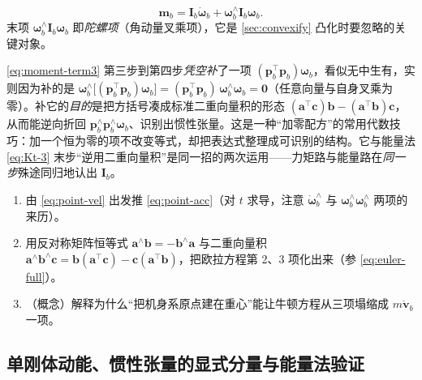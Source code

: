 \begin{equation}
  \boxed{\boldsymbol{m}_b=\mathbf{I}_b\dot{\boldsymbol{\omega}}_b+\boldsymbol{\omega}_b^\wedge\mathbf{I}_b\boldsymbol{\omega}_b}.
  \label{eq:euler-full}
\end{equation}
末项 $\boldsymbol{\omega}_b^\wedge\mathbf{I}_b\boldsymbol{\omega}_b$ 即\emph{陀螺项}（角动量叉乘项），它是 \cref{sec:convexify} 凸化时要忽略的关键对象。

\begin{note}\label{note:gyro-add-zero}
\cref{eq:moment-term3} 第三步到第四步\emph{凭空补}了一项 $(\boldsymbol{p}_b^\top\boldsymbol{p}_b)\boldsymbol{\omega}_b$，看似无中生有，实则因为补的是 $\boldsymbol{\omega}_b^\wedge\big[(\boldsymbol{p}_b^\top\boldsymbol{p}_b)\boldsymbol{\omega}_b\big]=(\boldsymbol{p}_b^\top\boldsymbol{p}_b)\,\boldsymbol{\omega}_b^\wedge\boldsymbol{\omega}_b=\mathbf{0}$（任意向量与自身叉乘为零）。补它的\emph{目的}是把方括号凑成标准二重向量积的形态 $(\boldsymbol{a}^\top\boldsymbol{c})\boldsymbol{b}-(\boldsymbol{a}^\top\boldsymbol{b})\boldsymbol{c}$，从而能逆向折回 $\boldsymbol{p}_b^\wedge\boldsymbol{p}_b^\wedge\boldsymbol{\omega}_b$、识别出惯性张量。这是一种“加零配方”的常用代数技巧：加一个恒为零的项不改变等式，却把表达式整理成可识别的结构。它与能量法 \cref{eq:Kt-3} 末步“逆用二重向量积”是同一招的两次运用——力矩路与能量路在\emph{同一步}殊途同归地认出 $\mathbf{I}_b$。
\end{note}

\begin{practice}
\begin{enumerate}
  \item 由 \cref{eq:point-vel} 出发推 \cref{eq:point-acc}（对 $t$ 求导，注意 $\dot{\boldsymbol{\omega}}_b^\wedge$ 与 $\boldsymbol{\omega}_b^\wedge\boldsymbol{\omega}_b^\wedge$ 两项的来历）。
  \item 用反对称矩阵恒等式 $\boldsymbol{a}^\wedge\boldsymbol{b}=-\boldsymbol{b}^\wedge\boldsymbol{a}$ 与二重向量积 $\boldsymbol{a}^\wedge\boldsymbol{b}^\wedge\boldsymbol{c}=\boldsymbol{b}(\boldsymbol{a}^\top\boldsymbol{c})-\boldsymbol{c}(\boldsymbol{a}^\top\boldsymbol{b})$，把欧拉方程第 2、3 项化出来（参 \cref{eq:euler-full}）。
  \item （概念）解释为什么“把机身系原点建在重心”能让牛顿方程从三项塌缩成 $m\dot{\boldsymbol{v}}_b$ 一项。
\end{enumerate}
\end{practice}

\subsection{单刚体动能、惯性张量的显式分量与能量法验证}
\label{subsec:srbd-energy}

